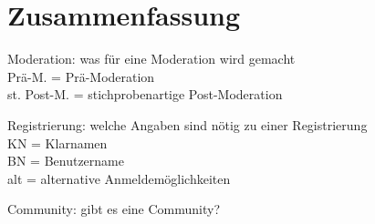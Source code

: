 \section{Zusammenfassung}

Moderation: was für eine Moderation wird gemacht\\
Prä-M. = Prä-Moderation\\
st. Post-M. = stichprobenartige Post-Moderation


Registrierung: welche Angaben sind nötig zu einer Registrierung\\
KN = Klarnamen\\
BN = Benutzername\\
alt = alternative Anmeldemöglichkeiten

Community: gibt es eine Community?

